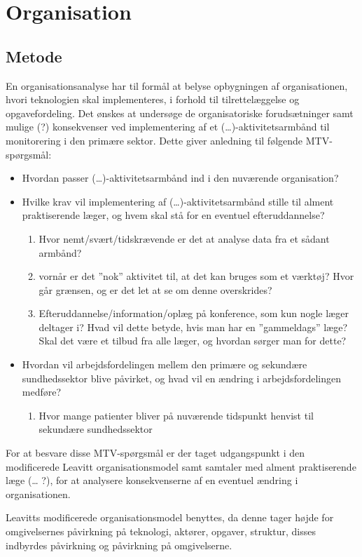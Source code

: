 \chapter{Organisation}
\section{Metode}
En organisationsanalyse har til formål at belyse opbygningen af organisationen, hvori teknologien skal implementeres, i forhold til tilrettelæggelse og opgavefordeling. Det ønskes at undersøge de organisatoriske forudsætninger samt mulige (?) konsekvenser ved implementering af et (…)-aktivitetsarmbånd til monitorering i den primære sektor. Dette giver anledning til følgende MTV-spørgsmål:

\begin{itemize}
\item Hvordan passer  (…)-aktivitetsarmbånd ind i den nuværende organisation? 
\item Hvilke krav vil implementering af (…)-aktivitetsarmbånd stille til alment praktiserende læger, og hvem skal stå for en eventuel efteruddannelse? 
\begin{enumerate}
\item Hvor nemt/svært/tidskrævende er det at analyse data fra et sådant armbånd?
\item vornår er det ”nok” aktivitet til, at det kan bruges som et værktøj? Hvor går grænsen, og er det let at se om denne overskrides? 
\item Efteruddannelse/information/oplæg på konference, som kun nogle læger deltager i? Hvad vil dette betyde, hvis man har en ”gammeldags” læge?  Skal det være et tilbud fra alle læger, og hvordan sørger man for dette?
\end{enumerate}
\item  Hvordan vil arbejdsfordelingen mellem den primære og sekundære sundhedssektor blive påvirket, og hvad vil en ændring i arbejdsfordelingen medføre?
\begin{enumerate}
\item Hvor mange patienter bliver på nuværende tidspunkt henvist til sekundære sundhedssektor
\end{enumerate} 
\end{itemize}

For at besvare disse MTV-spørgsmål er der taget udgangspunkt i den modificerede Leavitt organisationsmodel samt samtaler med alment praktiserende læge (… ?), for at analysere konsekvenserne af en eventuel ændring i organisationen. 

Leavitts modificerede organisationsmodel benyttes, da denne tager højde for omgivelsernes påvirkning på teknologi, aktører, opgaver, struktur, disses indbyrdes påvirkning og påvirkning på omgivelserne. 
